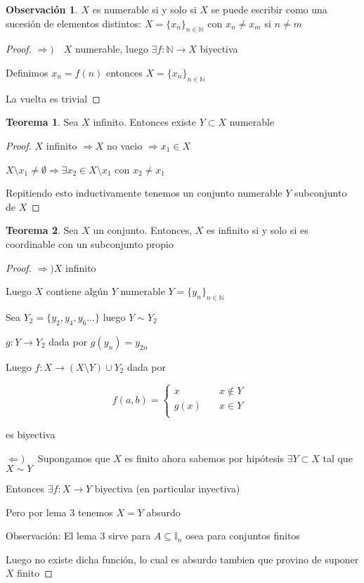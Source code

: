 \documentclass[12pt]{article}
\newcommand{\I}{\mathbb{I}}
\newcommand{\N}{\mathbb{N}}
\newcommand{\Ra}{\Rightarrow}
\newcommand{\ra}{\rightarrow}
\theoremstyle{definition}
\newtheorem*{remark}{Observación}
\newtheorem{theorem}{Teorema}
\begin{document}
\begin{remark}
  $X$ es numerable si y solo si $X$ se puede escribir como una sucesión de elementos distintos: $X = \{x_{n}\}_{n \in \N}$ con $x_{n} \neq x_{m}$ si $n \neq m$

  \begin{proof}
  $\Ra ) \quad X$ numerable, luego $ \exists f: \N \ra X$ biyectiva

  Definimos $x_{n} = f(n)$ entonces $X= \{x_{n}\}_{n \in \N}$
  
La vuelta es trivial
\end{proof}

\end{remark}

\begin{theorem}
  Sea $X$ infinito. Entonces existe $Y \subset X$ numerable

  \begin{proof}
    $X$ infinito $\Ra X$ no vacio $\Ra x_{1} \in X$

    $X \setminus {x_{1}} \neq \emptyset \Ra \exists x_{2} \in X \setminus {x_{1}}$ con $x_{2} \neq x_{1}$
  
Repitiendo esto inductivamente tenemos un conjunto numerable $Y$ subconjunto de $X$

  \end{proof}

\end{theorem}
\begin{theorem}
  Sea $X$ un conjunto. Entonces, $X$ es infinito si y solo si es coordinable con un subconjunto propio
  \begin{proof}
$\Ra ) X$ infinito

Luego $X$ contiene algún $Y$ numerable $Y=\{y_{n}\}_{n \in \N}$

Sea $Y_{2} = \{y_{2},y_{4},y_{6} \dots \}$ luego $Y \sim Y_{2}$

$g: Y \ra Y_{2}$ dada por $g(y_{n}) = y_{2n}$

Luego $f: X \ra (X \setminus Y) \cup Y_{2}$ dada por  

\[
f(a,b) =
     \begin{cases}
       \text{$x$} &\quad\text{$x \notin Y$ }\\
       \text{$g(x)$} &\quad\text{$x \in Y$} \\
     \end{cases}
\]

es biyectiva

$\Leftarrow ) \quad$ Supongamos que $X$ es finito ahora sabemos por hipótesis $\exists Y \subset X$ tal que $X \sim Y$ 

Entonces $\exists f:X \ra Y$ biyectiva (en particular inyectiva) 

Pero por lema 3 tenemos $X = Y$ absurdo 

Observación: El lema 3 sirve para $A \subseteq \I_{n}$ osea para conjuntos finitos

Luego no existe dicha función, lo cual es absurdo tambien que provino de suponer $X$ finito
\end{proof}
\end{theorem}
\end{document}
